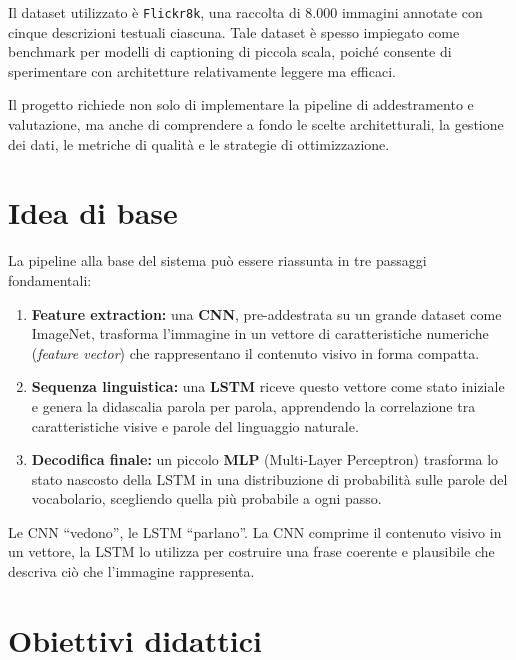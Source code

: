 \documentclass[11pt,a4paper]{report}
\newcommand{\dataset}{\texttt{Flickr8k}}
\begin{document}
Il dataset utilizzato è \dataset{}, una raccolta di 8.000 immagini annotate con cinque descrizioni testuali ciascuna.  
Tale dataset è spesso impiegato come benchmark per modelli di captioning di piccola scala, poiché consente di sperimentare con architetture relativamente leggere ma efficaci.

Il progetto richiede non solo di implementare la pipeline di addestramento e valutazione, ma anche di comprendere a fondo le scelte architetturali, la gestione dei dati, le metriche di qualità e le strategie di ottimizzazione.

\section{Idea di base}

La pipeline alla base del sistema può essere riassunta in tre passaggi fondamentali:

\begin{enumerate}
  \item \textbf{Feature extraction:} una \textbf{CNN}, pre-addestrata su un grande dataset come ImageNet, trasforma l’immagine in un vettore di caratteristiche numeriche (\emph{feature vector}) che rappresentano il contenuto visivo in forma compatta.
  \item \textbf{Sequenza linguistica:} una \textbf{LSTM} riceve questo vettore come stato iniziale e genera la didascalia parola per parola, apprendendo la correlazione tra caratteristiche visive e parole del linguaggio naturale.
  \item \textbf{Decodifica finale:} un piccolo \textbf{MLP} (Multi-Layer Perceptron) trasforma lo stato nascosto della LSTM in una distribuzione di probabilità sulle parole del vocabolario, scegliendo quella più probabile a ogni passo.
\end{enumerate}

\begin{tcolorbox}[title=Messaggio chiave]
Le CNN “vedono”, le LSTM “parlano”.  
La CNN comprime il contenuto visivo in un vettore, la LSTM lo utilizza per costruire una frase coerente e plausibile che descriva ciò che l’immagine rappresenta.
\end{tcolorbox}


\section{Obiettivi didattici}
\end{document}
